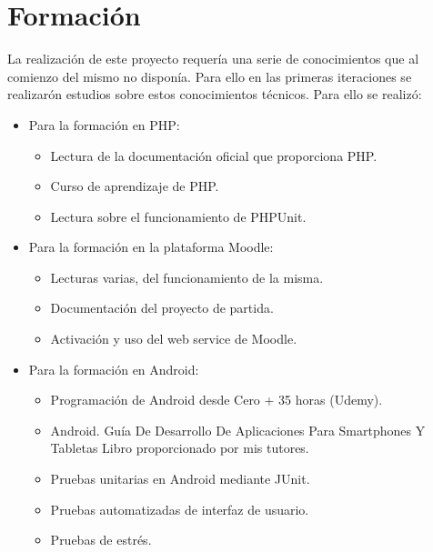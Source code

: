 \section{Formación}

La realización de este proyecto requería una serie de conocimientos que al comienzo del mismo no disponía. Para ello en las primeras iteraciones se realizarón estudios sobre estos conocimientos técnicos. Para ello se realizó:

\begin{itemize}

	\item Para la formación en PHP:
	
	\begin{itemize}
		
		\item Lectura de la documentación oficial que proporciona PHP. \cite{wiki:phpdoc}
		
		\item Curso de aprendizaje de PHP. \cite{wiki:phpcourse}
		
		\item Lectura sobre el funcionamiento de PHPUnit.
		
	\end{itemize}
	
	\item Para la formación en la plataforma Moodle:
	
	\begin{itemize}
	
			\item Lecturas varias, del funcionamiento de la misma.
			
			\item Documentación del proyecto de partida.
			
			\item Activación y uso del web service de Moodle.
	
	\end{itemize}
	
	\item Para la formación en Android:
	\begin{itemize}
		
		\item Programación de Android desde Cero + 35 horas (Udemy).
		
		\item Android. Guía De Desarrollo De Aplicaciones Para Smartphones Y Tabletas \cite{wiki:book} Libro proporcionado por mis tutores.
		
		\item Pruebas unitarias en Android mediante JUnit.
		
		\item Pruebas automatizadas de interfaz de usuario. \cite{wiki:espressoYouTube}
		
		\item Pruebas de estrés. \cite{wiki:monkey}
		
	
	\end{itemize}

\end{itemize}


